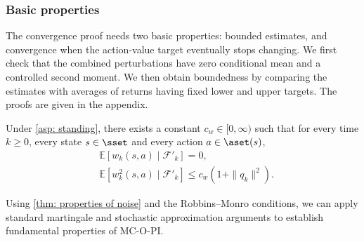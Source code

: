 % 



\subsubsection{Basic properties}
\label{sec: replacement foundations}
The convergence proof needs two basic properties: bounded estimates, and convergence when the action-value target eventually stops changing.
We first check that the combined perturbations have zero conditional mean and a controlled second moment. We then obtain boundedness by comparing the estimates with averages of returns having fixed lower and upper targets. The proofs are given in the appendix.

\begin{lemma}
\label{thm: properties of noise}
Under \autoref{asp: standing}, there exists a constant $c_w \in [0, \infty)$ 
such that for every time $k \ge 0$, every state $s \in \sset$ and every action $a \in \aset(s)$,
\begin{align}
\label{eq: muw_mds}
&\mathbb E\!\left[w_k(s,a) \mid \mathcal F'_k\right] = 0,
\\
\label{eq: muw_second_moment}
&\mathbb E\!\left[w_k^2(s,a) \mid \mathcal F'_k\right]
\le c_w(1+\|q_k\|^2) .
\end{align}
\end{lemma}


Using \autoref{thm: properties of noise} and the Robbins--Monro conditions,
we can apply standard martingale and stochastic approximation arguments to establish fundamental properties of MC-O-PI.


